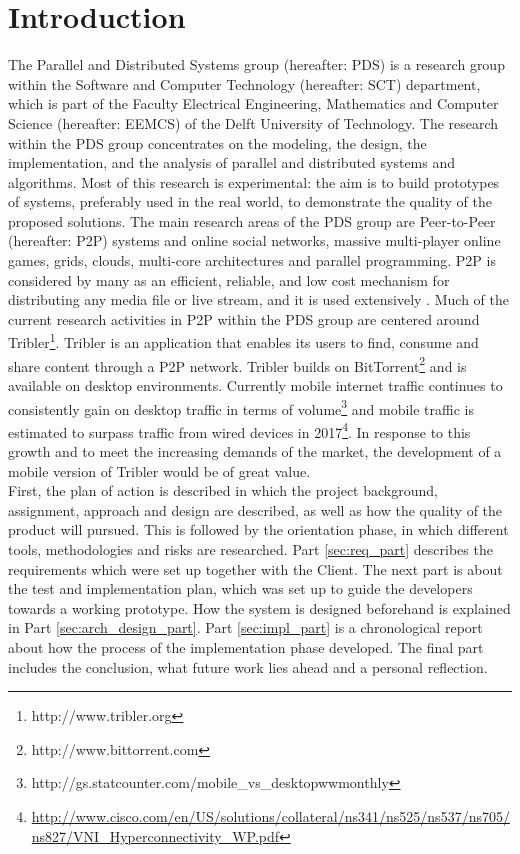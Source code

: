 \part{Introduction}
The Parallel and Distributed Systems group (hereafter: PDS) is a research group within the Software and Computer Technology (hereafter: SCT) department, which is part of the Faculty Electrical Engineering, Mathematics and Computer Science (hereafter: EEMCS) of the Delft University of Technology. The research within the PDS group concentrates on the modeling, the design, the implementation, and the analysis of parallel and distributed systems and algorithms. Most of this research is experimental: the aim is to build prototypes of systems, preferably used in the real world, to demonstrate the quality of the proposed solutions. The main research areas of the PDS group are Peer-to-Peer (hereafter: P2P) systems and online social networks, massive multi-player online games, grids, clouds, multi-core architectures and parallel programming. 
P2P is considered by many as an efficient, reliable, and low cost mechanism for distributing any media file or live stream, and it is used extensively \cite{internet_study}. Much of the current research activities in P2P within the PDS group are centered around Tribler\footnote{http://www.tribler.org}. Tribler is an application that enables its users to find, consume and share content through a P2P network. Tribler builds on BitTorrent\footnote{http://www.bittorrent.com} and is available on desktop environments. Currently mobile internet traffic continues to consistently gain on desktop traffic in terms of volume\footnote{http://gs.statcounter.com/mobile\_vs\_desktop\-ww\-monthly} and mobile traffic is estimated to surpass traffic from wired devices in 2017\footnote{\url{http://www.cisco.com/en/US/solutions/collateral/ns341/ns525/ns537/ns705/ns827/VNI\_Hyperconnectivity\_WP.pdf}}. In response to this growth and to meet the increasing demands of the market, the development of a mobile version of Tribler would be of great value. \\

First, the plan of action is described in which the project background, assignment, approach and design are described, as well as how the quality of the product will pursued. This is followed by the orientation phase, in which different tools, methodologies and risks are researched. Part \ref{sec:req_part} describes the requirements which were set up together with the Client. The next part is about the test and implementation plan, which was set up to guide the developers towards a working prototype. How the system is designed beforehand is explained in Part \ref{sec:arch_design_part}. Part \ref{sec:impl_part} is a chronological report about how the process of the implementation phase developed. The final part includes the conclusion, what future work lies ahead and a personal reflection.
